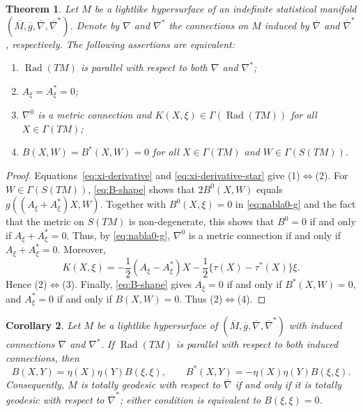 \documentclass[11pt,a4paper]{article}
\newtheorem{theorem}{Theorem}[section]
\newtheorem{corollary}[theorem]{Corollary}
\theoremstyle{remark}
\theoremstyle{definition}
\newcommand{\Rad}{\operatorname{Rad}}
\begin{document}
\begin{theorem}\label{thm:radical-both}
Let $M$ be a lightlike hypersurface of an indefinite statistical manifold
$(\overline{M},\overline{g},\overline{\nabla},\overline{\nabla}^{*})$.
Denote by $\nabla$ and $\nabla^{*}$ the connections on $M$ induced by
$\overline{\nabla}$ and $\overline{\nabla}^{*}$, respectively. The following
assertions are equivalent:
\begin{enumerate}
\item $\Rad(TM)$ is parallel with respect to both $\nabla$ and
$\nabla^{*}$;
\item $A_{\xi}=A_{\xi}^{*}=0$;
\item $\nabla^{0}$ is a metric connection and
$K(X,\xi)\in\Gamma(\Rad(TM))$ for all $X\in\Gamma(TM)$;
\item $B(X,W)=B^{*}(X,W)=0$ for all $X\in\Gamma(TM)$ and
$W\in\Gamma(S(TM))$.
\end{enumerate}
\end{theorem}

\begin{proof}
Equations~\eqref{eq:xi-derivative} and
\eqref{eq:xi-derivative-star} give (1)$\Leftrightarrow$(2). For $W\in\Gamma(S(TM))$, \eqref{eq:B-shape} shows that
$2B^{0}(X,W)$ equals $g((A_{\xi}+A_{\xi}^{*})X,W)$. Together with
$B^{0}(X,\xi)=0$ in \eqref{eq:nabla0-g} and the fact that the metric on
$S(TM)$ is non-degenerate, this shows that $B^{0}=0$ if and only if
$A_{\xi}+A_{\xi}^{*}=0$. Thus, by \eqref{eq:nabla0-g},
$\nabla^{0}$ is a metric connection if and only if
$A_{\xi}+A_{\xi}^{*}=0$. Moreover,
\begin{equation}\label{eq:K-xi}
K(X,\xi)
=-\frac12(A_{\xi}-A_{\xi}^{*})X
-\frac12\{\tau(X)-\tau^{*}(X)\}\xi.
\end{equation}
Hence (2)$\Leftrightarrow$(3). Finally, \eqref{eq:B-shape} gives
$A_{\xi}=0$ if and only if $B^{*}(X,W)=0$, and
$A_{\xi}^{*}=0$ if and only if $B(X,W)=0$. Thus
(2)$\Leftrightarrow$(4).
\end{proof}

\begin{corollary}\label{cor:radical-totally-geodesic}
Let $M$ be a lightlike hypersurface of
$(\overline{M},\overline{g},\overline{\nabla},\overline{\nabla}^{*})$ with
induced connections $\nabla$ and $\nabla^{*}$. If $\Rad(TM)$ is parallel
with respect to both induced connections, then
\begin{equation}\label{eq:B-radical-form}
B(X,Y)=\eta(X)\eta(Y)B(\xi,\xi),
\qquad
B^{*}(X,Y)=-\eta(X)\eta(Y)B(\xi,\xi).
\end{equation}
Consequently, $M$ is totally geodesic with respect to
$\overline{\nabla}$ if and only if it is totally geodesic with respect
to $\overline{\nabla}^{*}$; either condition is equivalent to
$B(\xi,\xi)=0$.
\end{corollary}
\end{document}
